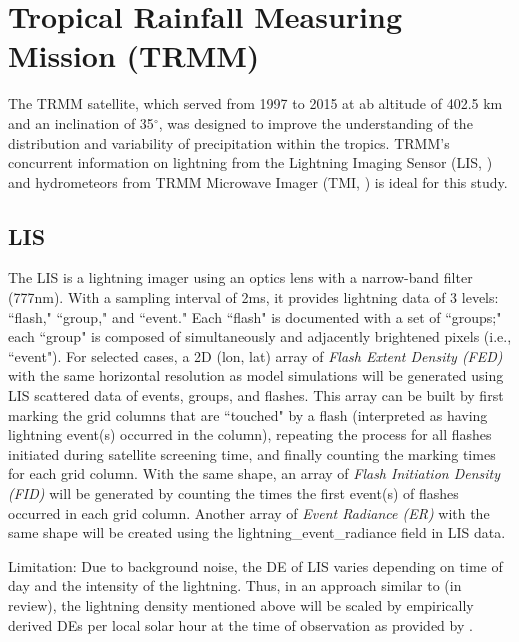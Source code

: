 \section{Tropical Rainfall Measuring Mission (TRMM)}
The TRMM satellite, which served from 1997 to 2015 at ab altitude of 402.5 km and an inclination of 35$^{\circ}$, was designed to improve the understanding of the distribution and variability of precipitation within the tropics. TRMM's concurrent information on lightning from the Lightning Imaging Sensor (LIS, \cite{Blakeslee1998Lightning}) and hydrometeors from TRMM Microwave Imager (TMI, \cite{wentz2015remote}) is ideal for this study. 
\subsection{LIS}
The LIS is a lightning imager using an optics lens with a narrow-band filter (777nm). With a sampling interval of 2ms, it provides lightning data of 3 levels: ``flash," ``group," and ``event." Each ``flash" is documented with a set of ``groups;" each ``group" is composed of simultaneously and adjacently brightened pixels (i.e., ``event").  For selected cases, a 2D (lon, lat) array of \textit{Flash Extent Density (FED)} with the same horizontal resolution as model simulations will be generated using LIS scattered data of events, groups, and flashes. This array can be built by first marking the grid columns that are ``touched" by a flash (interpreted as having lightning event(s) occurred in the column), repeating the process for all flashes initiated during satellite screening time, and finally counting the marking times for each grid column. With the same shape, an array of \textit{Flash Initiation Density (FID)} will be generated by counting the times the first event(s) of flashes occurred in each grid column. Another array of \textit{Event Radiance (ER)} with the same shape will be created using the lightning\_event\_radiance field in LIS data. 

Limitation: Due to background noise, the DE of LIS varies depending on time of day and the intensity of the lightning. Thus, in an approach similar to \cite{solimine2021relationships} (in review), the lightning density mentioned above will be scaled by empirically derived DEs per local solar hour at the time of observation as provided by \cite{cecil2014gridded}.

